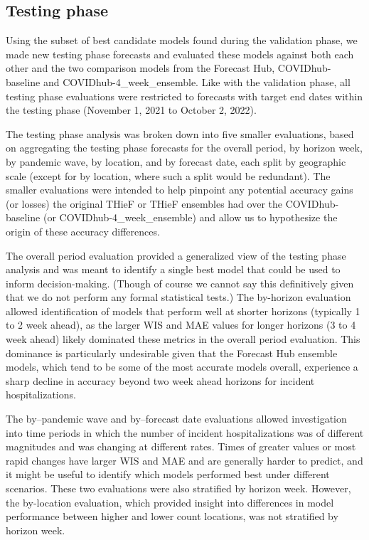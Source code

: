 \documentclass[thesis]{umassthesis}  %
\begin{document}
\subsection{Testing phase} \label{testing_eval}
Using the subset of best candidate models found during the validation phase, we made new testing phase forecasts and evaluated these models against both each other and the two comparison models from the Forecast Hub, COVIDhub-baseline and COVIDhub-4\_week\_ensemble. Like with the validation phase, all testing phase evaluations were restricted to forecasts with target end dates within the testing phase (November 1, 2021 to October 2, 2022).

The testing phase analysis was broken down into five smaller evaluations, based on aggregating the testing phase forecasts for the overall period, by horizon week, by pandemic wave, by location, and by forecast date, each split by geographic scale (except for by location, where such a split would be redundant). The smaller evaluations were intended to help pinpoint any potential accuracy gains (or losses) the original THieF or THieF ensembles had over the COVIDhub-baseline (or COVIDhub-4\_week\_ensemble) and allow us to hypothesize the origin of these accuracy differences.

The overall period evaluation provided a generalized view of the testing phase analysis and was meant to identify a single best model that could be used to inform decision-making. (Though of course we cannot say this definitively given that we do not perform any formal statistical tests\cite{lauer}.) The by-horizon evaluation allowed identification of models that perform well at shorter horizons (typically 1 to 2 week ahead), as the larger WIS and MAE values for longer horizons (3 to 4 week ahead) likely dominated these metrics in the overall period evaluation. This dominance is particularly undesirable given that the Forecast Hub ensemble models, which tend to be some of the most accurate models overall, experience a sharp decline in accuracy beyond two week ahead horizons for incident hospitalizations\cite{short_horizons}.

The by--pandemic wave and by--forecast date evaluations allowed investigation into time periods in which the number of incident hospitalizations was of different magnitudes and was changing at different rates. Times of greater values or most rapid changes have larger WIS and MAE and are generally harder to predict\cite{mech_bayes, short_horizons}, and it might be useful to identify which models performed best under different scenarios. These two evaluations were also stratified by horizon week. However, the by-location evaluation, which provided insight into differences in model performance between higher and lower count locations, was not stratified by horizon week.
\end{document}
